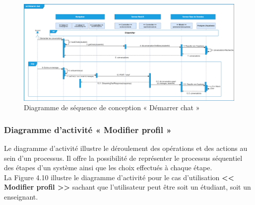 \begin{itemize}[itemsep=1pt, parsep=1pt]
\begin{figure}[H]
        \includegraphics[width=1.32\textwidth,height=1\textwidth,angle=90]{images/chp4/fig9.png}
        \caption{Diagramme de séquence de conception « Démarrer chat »}
        \label{fig:Diagramme de séquence de conception « Démarrer chat »}    
    \end{figure}
\end{itemize}


\subsubsection{Diagramme d’activité « Modifier profil »}
\justifying
Le diagramme d'activité illustre le déroulement des opérations et des actions au sein d'un processus. Il offre la possibilité de représenter le processus séquentiel des étapes d'un système ainsi que les choix effectués à chaque étape. \\
La Figure 4.10 illustre le diagramme d’activité pour le cas d’utilisation \textbf{<< Modifier profil >>} sachant que l'utilisateur peut être soit un étudiant, soit un enseignant.

